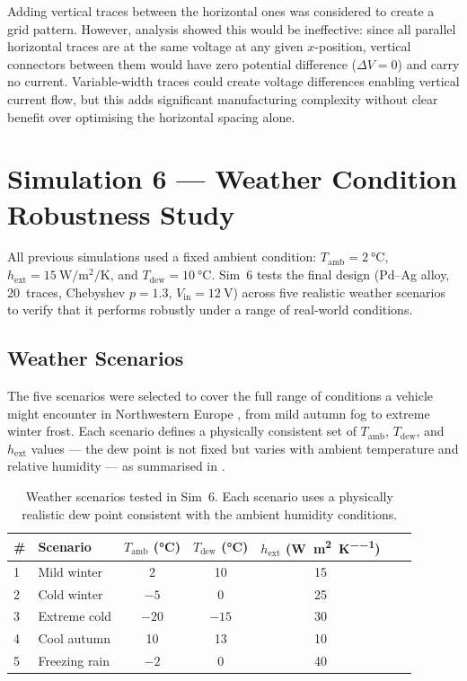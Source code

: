 Adding vertical traces between the horizontal ones was considered to create a grid pattern. However, analysis showed this would be ineffective: since all parallel horizontal traces are at the same voltage at any given $x$-position, vertical connectors between them would have zero potential difference ($\Delta V = 0$) and carry no current. Variable-width traces could create voltage differences enabling vertical current flow, but this adds significant manufacturing complexity without clear benefit over optimising the horizontal spacing alone.


\section{Simulation 6 --- Weather Condition Robustness Study}
\label{sec:sim6}

All previous simulations used a fixed ambient condition: $T_\text{amb} = \SI{2}{\celsius}$, $h_\text{ext} = \SI{15}{\watt\per\metre\squared\per\kelvin}$, and $T_\text{dew} = \SI{10}{\celsius}$. Sim~6 tests the final design (Pd--Ag alloy, 20~traces, Chebyshev $p = 1.3$, $V_\text{in} = \SI{12}{\volt}$) across five realistic weather scenarios to verify that it performs robustly under a range of real-world conditions.

\subsection{Weather Scenarios}

The five scenarios were selected to cover the full range of conditions a vehicle might encounter in Northwestern Europe \cite{hozejowska2019}, from mild autumn fog to extreme winter frost. Each scenario defines a physically consistent set of $T_\text{amb}$, $T_\text{dew}$, and $h_\text{ext}$ values — the dew point is not fixed but varies with ambient temperature and relative humidity \cite{lawrence2005} — as summarised in .

\begin{table}[H]
    \centering
    \caption{Weather scenarios tested in Sim~6. Each scenario uses a physically realistic dew point consistent with the ambient humidity conditions.}
    \label{tab:sim6-scenarios}
    \begin{tabular}{@{}llccccc@{}}
        \toprule
        \textbf{\#} & \textbf{Scenario} & $T_\text{amb}$ (\si{\celsius}) & $T_\text{dew}$ (\si{\celsius}) & $h_\text{ext}$ (\si{\watt\per\metre\squared\per\kelvin}) \\
        \midrule
        1 & Mild winter    &  2  & 10  & 15 \\
        2 & Cold winter    & $-5$  &  0  & 25 \\
        3 & Extreme cold   & $-20$ & $-15$ & 30 \\
        4 & Cool autumn    & 10  & 13  & 10 \\
        5 & Freezing rain  & $-2$  &  0  & 40 \\
        \bottomrule
    \end{tabular}
\end{table}

